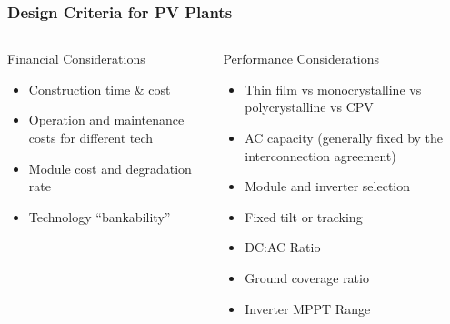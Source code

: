 \documentclass[aspectratio=169]{beamer}
\begin{document}
\begin{frame}
  \frametitle{Design Criteria for PV Plants}
  \begin{columns}[t]
    \begin{block}{Financial Considerations}
      \begin{itemize}
      \item Construction time \& cost
      \item Operation and maintenance costs for different tech
      \item Module cost and degradation rate
      \item Technology ``bankability''
      \end{itemize}
    \end{block}

    \begin{block}{Performance Considerations}
      \begin{itemize}
      \item Thin film vs monocrystalline vs polycrystalline vs CPV
      \item AC capacity (generally fixed by the interconnection agreement)
      \item Module and inverter selection
      \item Fixed tilt or tracking
      \item DC:AC Ratio
      \item Ground coverage ratio
      \item Inverter MPPT Range
      \end{itemize}
    \end{block}
  \end{columns}
\end{frame}
\end{document}
